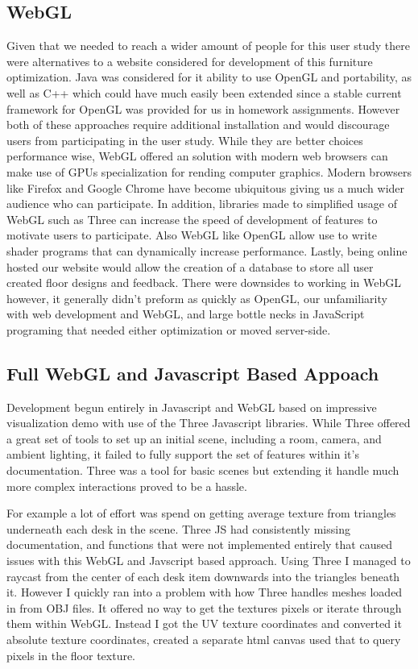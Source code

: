 \documentclass[twoside]{article}
\begin{document}
\begin{multicols}{2}
\subsection{WebGL}
Given that we needed to reach a wider amount of people for this user study there were alternatives to a website considered for
development of this furniture optimization. Java was considered for it ability to use OpenGL and portability, as well as C++ which
could have much easily been extended since a stable current framework for OpenGL was provided for us in homework assignments.
However both of these approaches require additional installation and would discourage users from participating in the user study. 
While they are better choices performance wise, WebGL offered an solution with modern web browsers can make use of GPUs specialization
for rending computer graphics. Modern browsers like Firefox and Google Chrome have become ubiquitous giving us a much wider audience 
who can participate. In addition, libraries made to simplified usage of WebGL such as Three can increase the speed of development of
features to motivate users to participate. Also WebGL like OpenGL allow use to write shader programs that can dynamically increase
performance. Lastly, being online hosted our website would allow the creation of a database to store all user created floor designs 
and feedback. There were downsides to working in WebGL however, it generally didn't preform as quickly as OpenGL, our unfamiliarity
with web development and WebGL, and large bottle necks in JavaScript programing that needed either optimization or moved server-side.

\subsection{ Full WebGL and Javascript Based Appoach}
Development begun entirely in Javascript and WebGL based on impressive visualization demo with use of the Three Javascript libraries.
While Three offered a great set of tools to set up an initial scene, including a room, camera, and ambient lighting, it failed to fully
support the set of features within it's documentation. Three was a tool for basic scenes but extending it handle much more complex
interactions proved to be a hassle. 


For example a lot of effort was spend on getting average texture from triangles underneath each desk
in the scene. Three JS had consistently missing documentation, and functions that were not implemented entirely that caused issues with
this WebGL and Javscript based approach. Using Three I managed to raycast from the center of each desk item downwards into the triangles
beneath it. However I quickly ran into a problem with how Three handles meshes loaded in from OBJ files. It offered no way to get the
textures pixels or iterate through them within WebGL. Instead I got the UV texture coordinates and converted it absolute texture
coordinates, created a separate html canvas used that to query pixels in the floor texture. 


\end{multicols}
\end{document}
